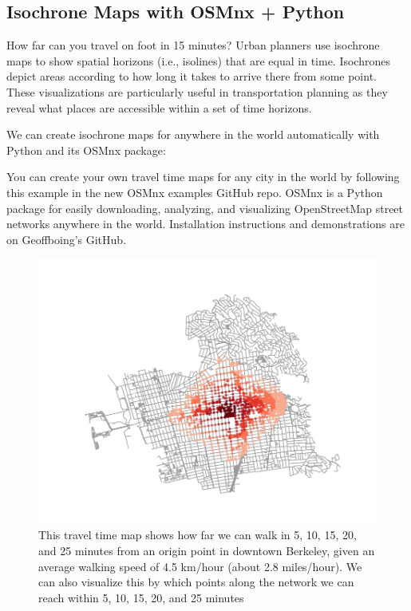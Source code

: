 \subsection{Isochrone Maps with OSMnx + Python}
How far can you travel on foot in 15 minutes? Urban planners use isochrone maps to show spatial horizons (i.e., isolines) that are equal in time. Isochrones depict areas according to how long it takes to arrive there from some point. These visualizations are particularly useful in transportation planning as they reveal what places are accessible within a set of time horizons.

We can create isochrone maps for anywhere in the world automatically with Python and its OSMnx package:
 
 
You can create your own travel time maps for any city in the world by following this example in the new OSMnx examples GitHub repo. OSMnx is a Python package for easily downloading, analyzing, and visualizing OpenStreetMap street networks anywhere in the world. Installation instructions and demonstrations are on Geoffboing's GitHub.\\
\begin{figure}
	\centering
	\includegraphics[scale=0.5]{input/images/plot2.jpg}              
	\caption{This travel time map shows how far we can walk in 5, 10, 15, 20, and 25 minutes from an origin point in downtown Berkeley, given an average walking speed of 4.5 km/hour (about 2.8 miles/hour). We can also visualize this by which points along the network we can reach within 5, 10, 15, 20, and 25 minutes}
\end{figure}\\
